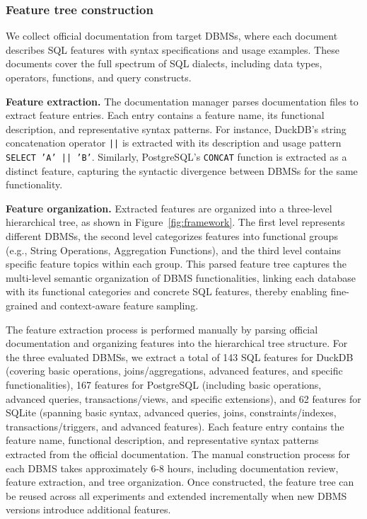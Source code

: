 \subsubsection{Feature tree construction}

We collect official documentation from target DBMSs, where each document describes SQL features with syntax specifications and usage examples. These documents cover the full spectrum of SQL dialects, including data types, operators, functions, and query constructs.

\textbf{Feature extraction.} The documentation manager parses documentation files to extract feature entries. Each entry contains a feature name, its functional description, and representative syntax patterns. For instance, DuckDB's string concatenation operator \texttt{||} is extracted with its description and usage pattern \texttt{SELECT 'A' || 'B'}. Similarly, PostgreSQL's \texttt{CONCAT} function is extracted as a distinct feature, capturing the syntactic divergence between DBMSs for the same functionality.

\textbf{Feature organization.} Extracted features are organized into a three-level hierarchical tree, as shown in Figure~\ref{fig:framework}. The first level represents different DBMSs, the second level categorizes features into functional groups (e.g., String Operations, Aggregation Functions), and the third level contains specific feature topics within each group. This parsed feature tree captures the multi-level semantic organization of DBMS functionalities, linking each database with its functional categories and concrete SQL features, thereby enabling fine-grained and context-aware feature sampling.

The feature extraction process is performed manually by parsing official documentation and organizing features into the hierarchical tree structure. For the three evaluated DBMSs, we extract a total of 143 SQL features for DuckDB (covering basic operations, joins/aggregations, advanced features, and specific functionalities), 167 features for PostgreSQL (including basic operations, advanced queries, transactions/views, and specific extensions), and 62 features for SQLite (spanning basic syntax, advanced queries, joins, constraints/indexes, transactions/triggers, and advanced features). Each feature entry contains the feature name, functional description, and representative syntax patterns extracted from the official documentation. The manual construction process for each DBMS takes approximately 6-8 hours, including documentation review, feature extraction, and tree organization. Once constructed, the feature tree can be reused across all experiments and extended incrementally when new DBMS versions introduce additional features.

